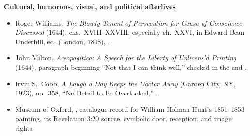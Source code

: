 \begin{deepstudy}
\textbf{Cultural, humorous, visual, and political afterlives}
{\footnotesize
\begin{itemize}[itemsep=0em,topsep=0.15em,parsep=0pt]
\item Roger Williams, \emph{The Bloudy Tenent of Persecution for Cause of Conscience Discussed} (1644), chs.~XVIII--XXVIII, especially ch.~XXVI, in Edward Bean Underhill, ed. (London, 1848), .
\item John Milton, \emph{Areopagitica: A Speech for the Liberty of Unlicens'd Printing} (1644), paragraph beginning “Not that I can think well,” checked in the  and .
\item Irvin S.~Cobb, \emph{A Laugh a Day Keeps the Doctor Away} (Garden City, NY, 1923), no.~358, “No Detail to Be Overlooked,” .
\item Museum of Oxford, , catalogue record for William Holman Hunt's 1851--1853 painting, its Revelation 3:20 source, symbolic door, reception, and image rights.
\end{itemize}}





{\footnotesize

}

\end{deepstudy}

